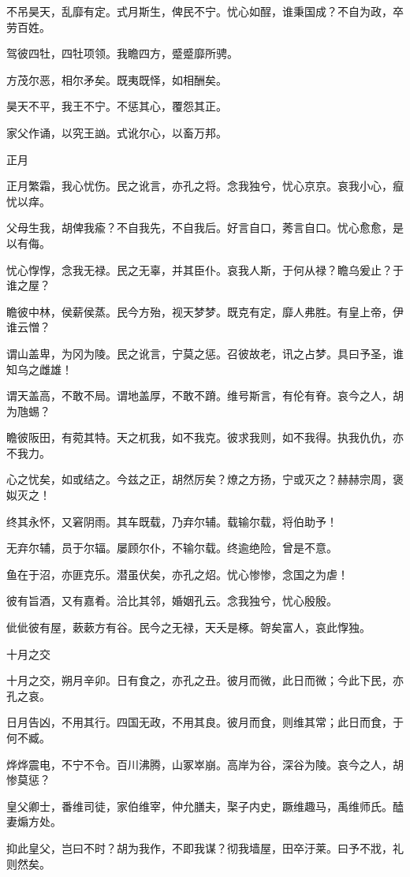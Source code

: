 不吊昊天，乱靡有定。式月斯生，俾民不宁。忧心如酲，谁秉国成？不自为政，卒劳百姓。

驾彼四牡，四牡项领。我瞻四方，蹙蹙靡所骋。

方茂尔恶，相尔矛矣。既夷既怿，如相酬矣。

昊天不平，我王不宁。不惩其心，覆怨其正。

家父作诵，以究王訩。式讹尔心，以畜万邦。

正月

正月繁霜，我心忧伤。民之讹言，亦孔之将。念我独兮，忧心京京。哀我小心，癙忧以痒。

父母生我，胡俾我瘉？不自我先，不自我后。好言自口，莠言自口。忧心愈愈，是以有侮。

忧心惸惸，念我无禄。民之无辜，并其臣仆。哀我人斯，于何从禄？瞻乌爰止？于谁之屋？

瞻彼中林，侯薪侯蒸。民今方殆，视天梦梦。既克有定，靡人弗胜。有皇上帝，伊谁云憎？

谓山盖卑，为冈为陵。民之讹言，宁莫之惩。召彼故老，讯之占梦。具曰予圣，谁知乌之雌雄！

谓天盖高，不敢不局。谓地盖厚，不敢不蹐。维号斯言，有伦有脊。哀今之人，胡为虺蜴？

瞻彼阪田，有菀其特。天之杌我，如不我克。彼求我则，如不我得。执我仇仇，亦不我力。

心之忧矣，如或结之。今兹之正，胡然厉矣？燎之方扬，宁或灭之？赫赫宗周，褒姒灭之！

终其永怀，又窘阴雨。其车既载，乃弃尔辅。载输尔载，将伯助予！

无弃尔辅，员于尔辐。屡顾尔仆，不输尔载。终逾绝险，曾是不意。

鱼在于沼，亦匪克乐。潜虽伏矣，亦孔之炤。忧心惨惨，念国之为虐！

彼有旨酒，又有嘉肴。洽比其邻，婚姻孔云。念我独兮，忧心殷殷。

佌佌彼有屋，蔌蔌方有谷。民今之无禄，天夭是椓。哿矣富人，哀此惸独。

十月之交

十月之交，朔月辛卯。日有食之，亦孔之丑。彼月而微，此日而微；今此下民，亦孔之哀。

日月告凶，不用其行。四国无政，不用其良。彼月而食，则维其常；此日而食，于何不臧。

烨烨震电，不宁不令。百川沸腾，山冢崒崩。高岸为谷，深谷为陵。哀今之人，胡惨莫惩？

皇父卿士，番维司徒，家伯维宰，仲允膳夫，棸子内史，蹶维趣马，禹维师氏。醘妻煽方处。

抑此皇父，岂曰不时？胡为我作，不即我谋？彻我墙屋，田卒汙莱。曰予不戕，礼则然矣。

